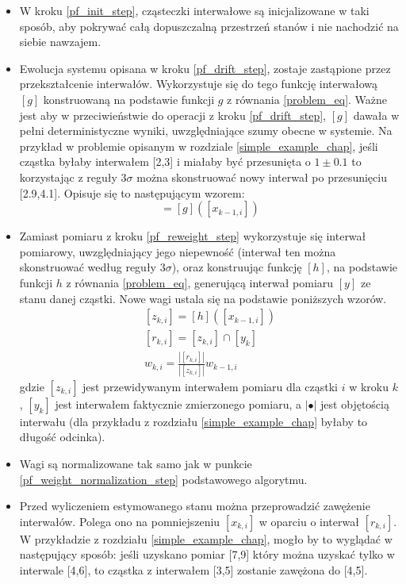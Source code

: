 \begin{itemize}
	\item W kroku \ref{pf_init_step}, cząsteczki interwałowe są inicjalizowane w taki sposób, aby pokrywać całą dopuszczalną przestrzeń stanów i nie nachodzić na siebie nawzajem.
	\item Ewolucja systemu opisana w kroku \ref{pf_drift_step}, zostaje zastąpione przez przekształcenie interwałów. Wykorzystuje się do tego funkcję interwałową $[g]$ konstruowaną na podstawie funkcji $g$ z równania \ref{problem_eq}. Ważne jest aby w przeciwieństwie do operacji z kroku \ref{pf_drift_step}, $[g]$ dawała w pełni deterministyczne wyniki, uwzględniające szumy obecne w systemie. Na przykład w problemie opisanym w rozdziale \ref{simple_example_chap}, jeśli cząstka byłaby interwałem [2,3] i miałaby być przesunięta o $1\pm 0.1$ to korzystając z reguły $3\sigma$ \cite{3_sigma_rule} można skonstruować nowy interwał po przesunięciu [2.9,4.1]. Opisuje się to następującym wzorem:
	\begin{equation}
		[x_{k,i}] = [g]([x_{k-1,i}])
	\end{equation}
	
	\item Zamiast pomiaru z kroku \ref{pf_reweight_step} wykorzystuje się interwał pomiarowy, uwzględniający jego niepewność (interwał ten można skonstruować według reguły $3\sigma$), oraz konstruując funkcję $[h]$, na podstawie funkcji $h$ z równania \ref{problem_eq}, generującą interwał pomiaru $[y]$ ze stanu danej cząstki. Nowe wagi ustala się na podstawie poniższych wzorów.
	\begin{equation}
		\begin{aligned}
			[z_{k,i}] = [h]([x_{k-1,i}])\\
			[r_{k,i}] = [z_{k,i}] \cap [y_{k}]\\
			w_{k,i} = \frac{|[r_{k,i}]|}{|[z_{k,i}]|} w_{k-1,i}
		\end{aligned}
	\end{equation}
	gdzie $[z_{k,i}]$ jest przewidywanym interwałem pomiaru dla cząstki $i$ w kroku $k$, $[y_{k}]$ jest interwałem faktycznie zmierzonego pomiaru, a $|\bullet|$ jest objętością interwału (dla przykładu z rozdziału \ref{simple_example_chap} byłaby to długość odcinka).
	\item Wagi są normalizowane tak samo jak w punkcie \ref{pf_weight_normalization_step} podstawowego algorytmu.
	
	\item Przed wyliczeniem estymowanego stanu można przeprowadzić zawężenie interwałów. Polega ono na pomniejszeniu $[x_{k,i}]$ w oparciu o interwał $[r_{k,i}]$. W przykładzie z rozdziału \ref{simple_example_chap}, mogło by to wyglądać w następujący sposób: jeśli uzyskano pomiar [7,9] który można uzyskać tylko w interwale [4,6], to cząstka z interwałem [3,5] zostanie zawężona do [4,5].
	

\end{itemize}
